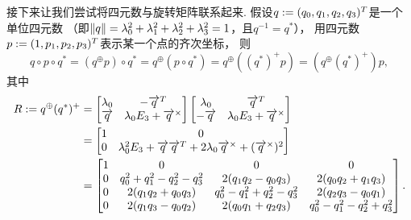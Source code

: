 接下来让我们尝试将四元数与旋转矩阵联系起来.
假设\(q := (q_0,q_1,q_2,q_3)^T\)是一个单位四元数
（即\(\norm{q} = \lambda_0^2 + \lambda_1^2 + \lambda_2^2 + \lambda_3^2 = 1\)，且\(q^{-1} = q^*\)），
用四元数\(p := (1,p_1,p_2,p_3)^T\)表示某一个点的齐次坐标，
则\begin{equation*}
	q \circ p \circ q^*
	= (q^\oplus p) \circ q^*
	= q^\oplus (p \circ q^*)
	= q^\oplus ((q^*)^+ p)
	= (q^\oplus (q^*)^+) p,
\end{equation*}
其中\begin{align*}
	R := q^\oplus (q^*)^+
	&= \begin{bmatrix}
		\lambda_0 & -\overrightarrow{q}^T \\
		\overrightarrow{q} & \lambda_0 E_3 + \overrightarrow{q}^\times \\
	\end{bmatrix}
	\begin{bmatrix}
		\lambda_0 & \overrightarrow{q}^T \\
		-\overrightarrow{q} & \lambda_0 E_3 + \overrightarrow{q}^\times \\
	\end{bmatrix}
	\\
	&= \begin{bmatrix}
		1 & 0 \\
		0 & \lambda_0^2 E_3 + \overrightarrow{q} \overrightarrow{q}^T + 2 \lambda_0 \overrightarrow{q}^\times + (\overrightarrow{q}^\times)^2 \\
	\end{bmatrix}
	\\
	&= \begin{bmatrix}
		1 & 0 & 0 & 0 \\
		0 & q_0^2 + q_1^2 - q_2^2 - q_3^2 & 2 (q_1 q_2 - q_0 q_3) & 2 (q_0 q_2 + q_1 q_3) \\
		0 & 2 (q_1 q_2 + q_0 q_3) & q_0^2 - q_1^2 + q_2^2 - q_3^2 & 2 (q_2 q_3 - q_0 q_1) \\
		0 & 2 (q_1 q_3 - q_0 q_2) & 2 (q_0 q_1 + q_2 q_3) & q_0^2 - q_1^2 - q_2^2 + q_3^2 \\
	\end{bmatrix}.
\end{align*}
